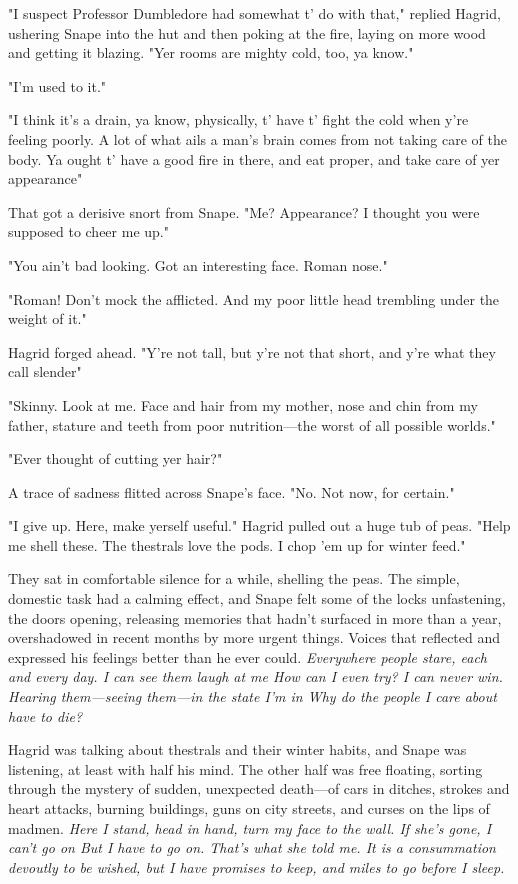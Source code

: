 "I suspect Professor Dumbledore had somewhat t' do with that," replied Hagrid, ushering Snape into the hut and then poking at the fire, laying on more wood and getting it blazing. "Yer rooms are mighty cold, too, ya know."

"I'm used to it."

"I think it's a drain, ya know, physically, t' have t' fight the cold when y're feeling poorly. A lot of what ails a man's brain comes from not taking care of the body. Ya ought t' have a good fire in there, and eat proper, and take care of yer appearance{\el}"

That got a derisive snort from Snape. "Me? Appearance? I thought you were supposed to cheer me up."

"You ain't bad looking. Got an interesting face. Roman nose."

"Roman! Don't mock the afflicted. And my poor little head trembling under the weight of it."

Hagrid forged ahead. "Y're not tall, but y're not that short, and y're what they call slender{\el}"

"Skinny. Look at me. Face and hair from my mother, nose and chin from my father, stature and teeth from poor nutrition—the worst of all possible worlds."

"Ever thought of cutting yer hair?"

A trace of sadness flitted across Snape's face. "No. Not now, for certain."

"I give up. Here, make yerself useful." Hagrid pulled out a huge tub of peas. "Help me shell these. The thestrals love the pods. I chop 'em up for winter feed."

They sat in comfortable silence for a while, shelling the peas. The simple, domestic task had a calming effect, and Snape felt some of the locks unfastening, the doors opening, releasing memories that hadn't surfaced in more than a year, overshadowed in recent months by more urgent things. Voices that reflected and expressed his feelings better than he ever could. \emph{Everywhere people stare, each and every day. I can see them laugh at me{\el} How can I even try? I can never win. Hearing them—seeing them—in the state I'm in{\el} Why do the people I care about have to die?}

Hagrid was talking about thestrals and their winter habits, and Snape was listening, at least with half his mind. The other half was free floating, sorting through the mystery of sudden, unexpected death—of cars in ditches, strokes and heart attacks, burning buildings, guns on city streets, and curses on the lips of madmen. \emph{Here I stand, head in hand, turn my face to the wall. If she's gone, I can't go on{\el} But I have to go on. That's what she told me. It is a consummation devoutly to be wished, but I have promises to keep, and miles to go before I sleep.}

